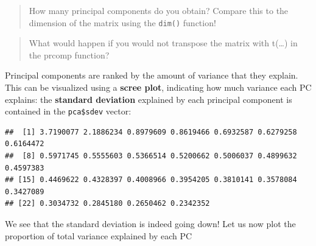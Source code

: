 \documentclass[
]{book}
\newenvironment{Shaded}{\begin{snugshade}}{\end{snugshade}}
\newcommand{\AttributeTok}[1]{\textcolor[rgb]{0.13,0.29,0.53}{#1}}
\newcommand{\CommentTok}[1]{\textcolor[rgb]{0.56,0.35,0.01}{\textit{#1}}}
\newcommand{\DecValTok}[1]{\textcolor[rgb]{0.00,0.00,0.81}{#1}}
\newcommand{\FunctionTok}[1]{\textcolor[rgb]{0.13,0.29,0.53}{\textbf{#1}}}
\newcommand{\NormalTok}[1]{#1}
\newcommand{\OtherTok}[1]{\textcolor[rgb]{0.56,0.35,0.01}{#1}}
\newcommand{\SpecialCharTok}[1]{\textcolor[rgb]{0.81,0.36,0.00}{\textbf{#1}}}
\newcommand{\StringTok}[1]{\textcolor[rgb]{0.31,0.60,0.02}{#1}}
\begin{document}
\begin{quote}
How many principal components do you obtain? Compare this to the dimension of the matrix using the \texttt{dim()} function!
\end{quote}

\begin{quote}
What would happen if you would not transpose the matrix with t(\ldots) in the prcomp function?
\end{quote}

Principal components are ranked by the amount of variance that they explain. This can be visualized using a \textbf{scree plot}, indicating how much variance each PC explains: the \textbf{standard deviation} explained by each principal component is contained in the \texttt{pca\$sdev} vector:

\begin{Shaded}
\end{Shaded}

\begin{verbatim}
##  [1] 3.7190077 2.1886234 0.8979609 0.8619466 0.6932587 0.6279258 0.6164472
##  [8] 0.5971745 0.5555603 0.5366514 0.5200662 0.5006037 0.4899632 0.4597383
## [15] 0.4469622 0.4328397 0.4008966 0.3954205 0.3810141 0.3578084 0.3427089
## [22] 0.3034732 0.2845180 0.2650462 0.2342352
\end{verbatim}

We see that the standard deviation is indeed going down! Let us now plot the proportion of total variance explained by each PC

\begin{Shaded}
\end{Shaded}
\end{document}
